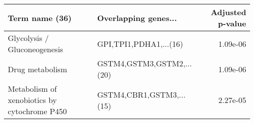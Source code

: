 \begin{tabular}{llr}
\toprule
                              Term name (36) &      Overlapping genes... &  Adjusted p-value \\
\midrule
                Glycolysis / Gluconeogenesis &    GPI,TPI1,PDHA1,...(16) &          1.09e-06 \\
                             Drug metabolism & GSTM4,GSTM3,GSTM2,...(20) &          1.09e-06 \\
Metabolism of xenobiotics by cytochrome P450 &  GSTM4,CBR1,GSTM3,...(15) &          2.27e-05 \\
\bottomrule
\end{tabular}
